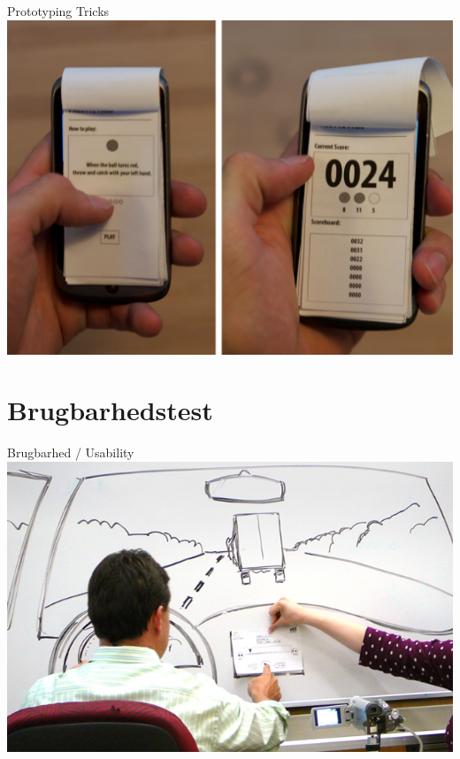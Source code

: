 \documentclass[10pt]{beamer}
\begin{document}
\begin{frame}{Prototyping Tricks}
\centering
	\includegraphics[width=\linewidth]{img/prototypingflip.jpg}
\end{frame}

 
\section{Brugbarhedstest}

\begin{frame}{Brugbarhed / Usability}
		\includegraphics[width=\linewidth]{img/carusability.jpg}
\end{frame}
\end{document}
